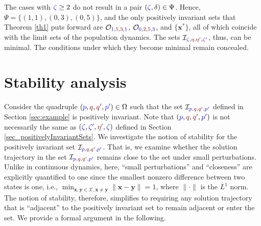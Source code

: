 \documentclass[10 pt,twocolumn,journal]{IEEEtran}
\theoremstyle{plain}
\renewcommand{\O}{\mathcal{O}}
\newcommand{\I}{\mathcal{I}}
\newcommand{\X}{\mathcal{X}}
\newcommand{\x}{\bm{x}}
\newcommand{\y}{\bm{y}}
\newcommand{\p}{\tb{p}}
\newcommand{\pp}{\tb{p'}}
\newcommand{\q}{\tr{q}}
\newcommand{\qq}{\tr{q'}}
\renewcommand{\r}{\tb{\zeta}}
\newcommand{\rr}{\tb{\zeta'}}
\newcommand{\s}{\tr{\eta}}
\renewcommand{\ss}{\tr{\eta'}}
\newcommand{\tb}{\textcolor{blue}}
\newcommand{\tr}{\textcolor{Myred}}
\theoremstyle{definition}
\begin{document}
The cases with $\r\geq2$ do not result in a pair $(\r,\delta)\in\Psi$.
Hence, $\Psi=\{(1,1),(0,3),(0,5)\}$, and the only positively invariant sets that Theorem \ref{th1} puts forward are $\O_{\tb{1}, \tr{5}, \tr{3}, \tb{1}}$, $\O_{\tb{0}, \tr{2}, \tr{5}, \tb{3}}$, and $\{\x^*\}$, all of which coincide with the limit sets of the population dynamics. 
The sets $\I_{\r,\s,\ss,\rr}$, thus, can be minimal. 
The conditions under which they become minimal remain concealed.


\section{Stability analysis}    \label{sec_stability}
Consider the quadruple $(\p,\q,\qq,\pp)\in\Omega$ such that the set $\I_{\p,\q,\qq,\pp}$ defined in Section \ref{sec:example} is positively invariant. 
Note that $(\p,\q,\qq,\pp)$ is not necessarily the same as $(\r,\rr,\ss,\r)$ defined in Section \ref{sec_positivelyInvariantSets}. 
We investigate the notion of stability for the positively invariant set $\I_{\p,\q,\qq,\pp}$.
That is, we examine whether the solution trajectory in the set $\I_{\p,\q,\qq,\pp}$ remains close to the set under small perturbations. 
Unlike in continuous dynamics, here, ``small perturbations'' and ``closeness'' are explicitly quantified to one since the smallest nonzero difference between two states is one, i.e., $\min_{\x,\y\in\X,\x\neq\y}\|\x-\y\| = 1$, where $\|\cdot\|$ is the $L^1$ norm.
The notion of stability, therefore, simplifies to requiring any solution trajectory that is ``adjacent'' to the positively invariant set to remain adjacent or enter the set. 
We provide a formal argument in the following. 
\end{document}
